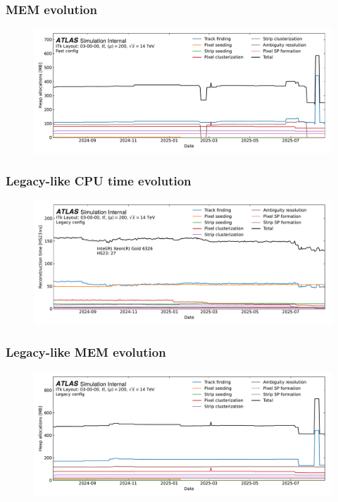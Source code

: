 \documentclass[aspectratio=169]{beamer}
\begin{document}
\begin{frame}
\frametitle{MEM evolution}
\begin{figure}[h]
    \centering
    \includegraphics[width=1.0\textwidth]{plots/appendix/fast_tracking_spot_mem.pdf}
\end{figure}
\end{frame}

\begin{frame}
\frametitle{Legacy-like CPU time evolution}
\begin{figure}[h]
    \centering
    \includegraphics[width=1.0\textwidth]{plots/appendix/legacy_tracking_spot.pdf}
\end{figure}
\end{frame}

\begin{frame}
\frametitle{Legacy-like MEM evolution}
\begin{figure}[h]
    \centering
    \includegraphics[width=1.0\textwidth]{plots/appendix/legacy_tracking_spot_mem.pdf}
\end{figure}
\end{frame}
\end{document}
